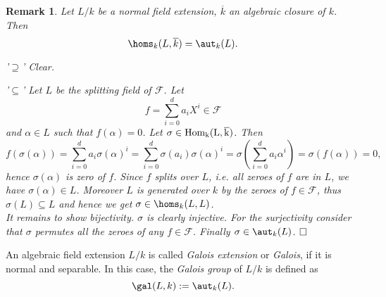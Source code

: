 \documentclass[11pt]{book}
\newtheorem{remark}[theorem]{Remark}
\theoremstyle{nonumberbreak}
\newenvironment{defin}[1][]{\ifthenelse{\equal{#1}{}}{\definition}{\definition[#1]}\rm}{\enddefinition}
\newenvironment{pr}[1][]{\ifthenelse{\equal{#1}{}}{\proof}{\proof[#1]}\rm}{\endproof}
\begin{document}
\begin{spacing}{1.3}
\begin{remark} %
Let $L/k$ be a normal field extension, $\overline{k}$ an algebraic closure of $k$. Then 
$$\homs_{k}(L,\overline{k})=\aut_{k}(L).$$
\begin{pr}
\begin{compactitem}
\item['$\supseteq$'] Clear.
\item['$\subseteq$'] Let $L$ be the splitting field of $\mathcal{F}$. Let $$f=\sum_{i=0}^d a_i X^{i} \in \mathcal{F}$$ and $\alpha \in  L$ such that $f(\alpha)=0$. Let $\sigma \in \rm{Hom}_{k}(L, \overline{k})$. Then
$$f\left(\sigma(\alpha)\right)=\sum_{i=0}^d a_i \sigma(\alpha)^{i} = \sum_{i=0}^d \sigma(a_i) \sigma(\alpha)^{i} = \sigma\left(\sum_{i=0}^d a_i \alpha^{i}\right)= \sigma \left(f(\alpha)\right)=0,$$hence $\sigma(\alpha)$ is zero of $f$. Since $f$ splits over $L$, i.e. all zeroes of $f$ are in $L$, we have $\sigma(\alpha) \in L$. Moreover $L$ is generated over $k$ by the zeroes of $f \in \mathcal{F}$, thus $\sigma(L)\subseteq L$ and hence we get $\sigma \in \homs_{k}(L,L)$.\\
It remains to show bijectivity. $\sigma$ is clearly injective. For the surjectivity consider that $\sigma$ permutes all the zeroes of any $f \in \mathcal{F}$. Finally $\sigma \in \aut_{k}(L)$. $\hfill \Box$
\end{compactitem}
\end{pr}
\end{remark}

\begin{defin} %
An algebraic field extension $L/k$ is called \textit{Galois extension} or \textit{Galois}, if it is normal and separable. In this case, the \textit{Galois group} of $L/k$ is defined as
$$\gal(L,k):=\aut_{k}(L).$$
\end{defin}


\end{spacing}
\end{document}
